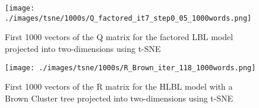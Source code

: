 
\begin{figure}[h]
\texttt{[image: ./images/tsne/1000s/Q\_factored\_it7\_step0\_05\_1000words.png]} 
\centering
\caption{First 1000 vectors of the Q matrix for the factored LBL model projected into two-dimensions using t-SNE}
\end{figure}






\begin{figure}[h]
\texttt{[image: ./images/tsne/1000s/R\_Brown\_iter\_118\_1000words.png]} 
\centering
\caption{First 1000 vectors of the R matrix for the HLBL model with a Brown Cluster tree projected into two-dimensions using t-SNE}
\end{figure}
%
%
%
%

